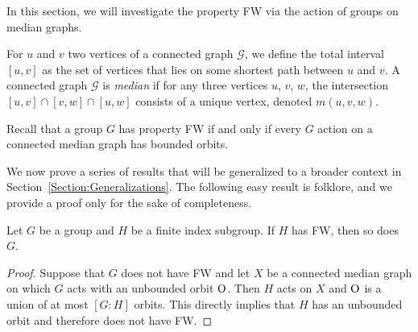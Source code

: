 \label{Section:Median}
In this section, we will investigate the property FW via the action of groups on median graphs.

For $u$ and $v$ two vertices of a connected graph $\mathcal G$, we define the total interval $[u,v]$ as the set of vertices that lies on some shortest path between $u$ and $v$.
A connected graph $\mathcal G$ is \emph{median} if for any three vertices $u$, $v$, $w$, the intersection $[u,v]\cap[v,w]\cap[u,w]$ consists of a unique vertex, denoted $m(u,v,w)$.

Recall that a group $G$ has property FW if and only if every $G$ action on a connected median graph has bounded orbits.

We now prove a series of results that will be generalized to a broader context in Section~\ref{Section:Generalizations}.
The following easy result is folklore, and we provide a proof only for the sake of completeness.
\begin{lem}\label{Lemma:Subgroup}
Let $G$ be a group and $H$ be a finite index subgroup.
If $H$ has FW, then so does~$G$.
\end{lem}
\begin{proof}
Suppose that $G$ does not have FW and let $X$ be a connected median graph on which $G$ acts with an unbounded orbit $\operatorname{O}$.
Then $H$ acts on $X$ and $\operatorname{O}$ is a union of at most $[G:H]$ orbits. This directly implies that $H$ has an unbounded orbit and therefore does not have FW.
\end{proof}

